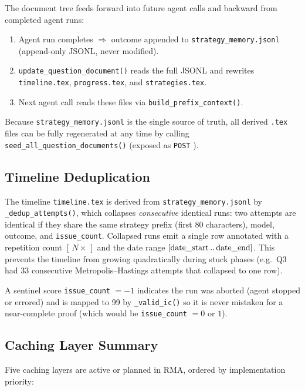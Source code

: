 \documentclass[11pt]{article}
\newcommand{\pa}[1]{\path{#1}}
\begin{document}
The document tree feeds forward into future agent calls and backward from
completed agent runs:
\begin{enumerate}[nosep]
  \item Agent run completes $\Rightarrow$ outcome appended to
    \texttt{strategy\_memory.jsonl} (append-only JSONL, never modified).
  \item \texttt{update\_question\_document()} reads the full JSONL and rewrites
    \texttt{timeline.tex}, \texttt{progress.tex}, and \texttt{strategies.tex}.
  \item Next agent call reads these files via \texttt{build\_prefix\_context()}.
\end{enumerate}
Because \texttt{strategy\_memory.jsonl} is the single source of truth,
all derived \texttt{.tex} files can be fully regenerated at any time by
calling \texttt{seed\_all\_question\_documents()} (exposed as
\texttt{POST} \pa{/api/docs/regenerate-all}).

\subsection{Timeline Deduplication}

The timeline \texttt{timeline.tex} is derived from
\texttt{strategy\_memory.jsonl} by \texttt{\_dedup\_attempts()},
which collapses \emph{consecutive} identical runs:
two attempts are identical if they share the same
strategy prefix (first 80 characters), model, outcome, and
\texttt{issue\_count}.
Collapsed runs emit a single row annotated with a repetition count
$[\,N{\times}\,]$ and the date range
$[\text{date\_start}\mathinner{..}\text{date\_end}]$.
This prevents the timeline from growing quadratically during stuck phases
(e.g.\ Q3 had 33 consecutive Metropolis--Hastings attempts that collapsed
to one row).

A sentinel score \texttt{issue\_count} $= -1$ indicates the run was
aborted (agent stopped or errored) and is mapped to 99 by \texttt{\_valid\_ic()}
so it is never mistaken for a near-complete proof (which would be
\texttt{issue\_count} $= 0$ or $1$).

\subsection{Caching Layer Summary}

Five caching layers are active or planned in RMA, ordered by implementation
priority:
\end{document}

